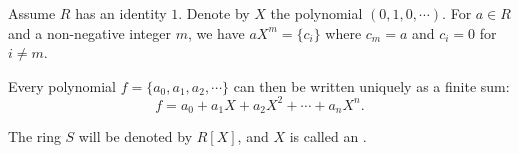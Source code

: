 Assume $R$ has an identity $1$. Denote by $X$ the polynomial $(0, 1, 0, \cdots)$. For $a \in R$ and a non-negative integer $m$, we have $aX^m = \{c_i\}$ where $c_m = a$ and $c_i = 0$ for $i \neq m$.

Every polynomial $f = \{a_0, a_1, a_2, \cdots\}$ can then be written uniquely as a finite sum:
$$f = a_0 + a_1 X + a_2 X^2 + \cdots + a_n X^n.$$

The ring $S$ will be denoted by $R[X]$, and $X$ is called an .
